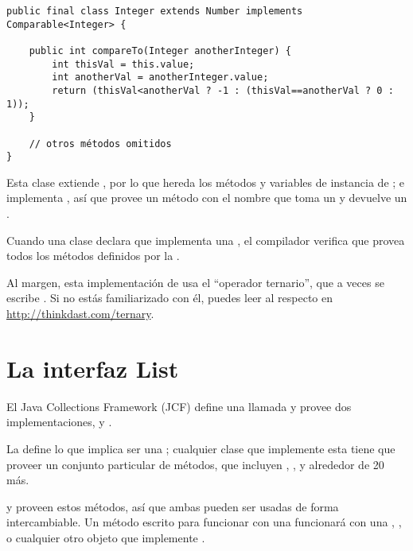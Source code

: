 \documentclass[12pt]{book}
\theoremstyle{exercise}
\begin{document}
\begin{verbatim}
public final class Integer extends Number implements Comparable<Integer> {

    public int compareTo(Integer anotherInteger) {
        int thisVal = this.value;
        int anotherVal = anotherInteger.value;
        return (thisVal<anotherVal ? -1 : (thisVal==anotherVal ? 0 : 1));
    }

    // otros métodos omitidos
}
\end{verbatim}

Esta clase extiende , por lo que hereda los métodos y
variables de instancia de ; e implementa
, así que provee un método con el nombre
 que toma un  y devuelve
un .


Cuando una clase declara que implementa una , el compilador
verifica que provea todos los métodos definidos por la .


Al margen, esta implementación de  usa el
``operador ternario'', que a veces se escribe .  Si no estás
familiarizado con él, puedes leer al respecto en
\url{http://thinkdast.com/ternary}.


\section{La interfaz List}
\label{the-list-interface}

El Java Collections Framework (JCF) define una  llamada
 y provee dos implementaciones,  y
.


La  define lo que implica ser una ; cualquier
clase que implemente esta  tiene que proveer un
conjunto particular de métodos, que incluyen , ,
 y alrededor de 20 más.

 y  proveen estos métodos, así que
ambas pueden ser usadas de forma intercambiable. Un método escrito
para funcionar con una  funcionará con una , ,
o cualquier otro objeto que implemente .

\end{document}
